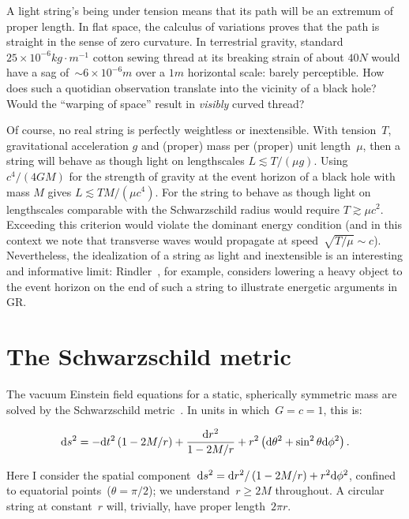 \documentclass[review]{elsarticle}
\begin{document}
A light string's being under tension means that its path will be an
extremum of proper length.  In flat space, the calculus of variations
proves that the path is straight in the sense of zero curvature.  In
terrestrial gravity, standard $25\times
10^{-6}\unit{kg}\cdot\unit{m}^{-1}$ cotton sewing thread at its breaking
strain of about $40\unit{N}$ would have a sag of~$\sim 6\times
10^{-6}\unit{m}$ over a $1\unit{m}$ horizontal scale: barely perceptible.
How does such a quotidian observation translate into the vicinity of a
black hole?  Would the ``warping of space'' result in {\em visibly}
curved thread?

Of course, no real string is perfectly weightless or inextensible.
With tension~$T$, gravitational acceleration $g$ and (proper) mass per
(proper) unit length~$\mu$, then a string will behave as though light
on lengthscales $L\lesssim T/\left(\mu g\right)$.  Using
$c^4/\left(4GM\right)$ for the strength of gravity at the event
horizon of a black hole with mass $M$ gives $L\lesssim TM/\left(\mu
c^4\right)$.  For the string to behave as though light on lengthscales
comparable with the Schwarzschild radius would require $T\gtrsim\mu
c^2$.  Exceeding this criterion would violate the dominant energy
condition (and in this context we note that transverse waves would
propagate at speed~$\sqrt{T/\mu}\sim c$).  Nevertheless, the
idealization of a string as light and inextensible is an interesting
and informative limit: Rindler~\cite{rindler}, for example, considers
lowering a heavy object to the event horizon on the end of such a
string to illustrate energetic arguments in GR.

\section{The Schwarzschild metric}

The vacuum Einstein field equations for a static, spherically
symmetric mass are solved by the Schwarzschild
metric~\cite{schwarzschild1916}.  In units in which~$G=c=1$, this is:

\begin{equation}\label{schwarzschild}
\mathrm{d} s^2= -\mathrm{d} t^2\left(1-2M/r\right) +\frac{\mathrm{d} r^2}{1-2M/r} + r^2\left(\mathrm{d}\theta^2 + \sin^2\theta\mathrm{d}\phi^2\right).
\end{equation}

\noindent Here I consider the spatial component~$\mathrm{d} s^2=
\mathrm{d} r^2/\left(1-2M/r\right) + r^2\mathrm{d}\phi^2$, confined to equatorial
points~($\theta=\pi/2$); we understand~$r\geqslant 2M$ throughout.  A
circular string at constant~$r$ will, trivially, have proper
length~$2\pi r$.
\end{document}
